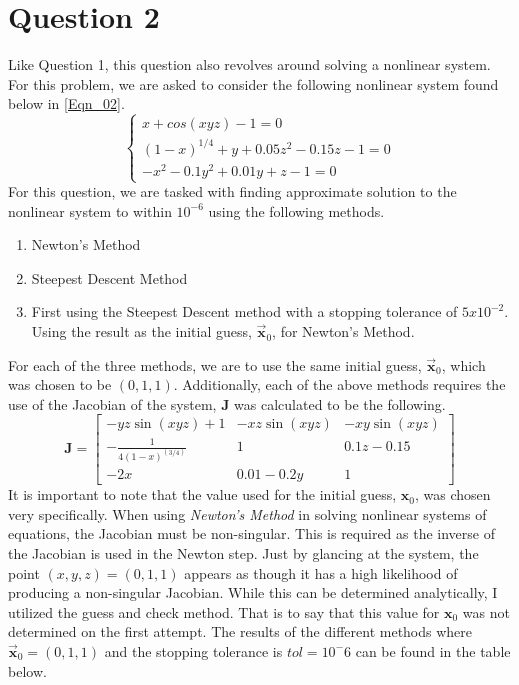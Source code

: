 \documentclass{article}
\begin{document}
\section{Question 2}
Like Question 1, this question also revolves around solving a nonlinear system. For this problem, we are asked to consider the following nonlinear system found below in \ref{Eqn_02}.
\begin{equation}
    \label{Eqn_02}
    \begin{cases}
        x+cos(xyz)-1=0 \\
        (1-x)^{1/4}+y+0.05z^2-0.15z-1 = 0 \\
        -x^2-0.1y^2+0.01y+z-1=0
    \end{cases}
\end{equation}
For this question, we are tasked with finding approximate solution to the nonlinear system to within \(10^{-6}\) using the following methods.
\begin{enumerate}
    \item Newton's Method
    \item Steepest Descent Method
    \item First using the Steepest Descent method with a stopping tolerance of \(5x10^{-2}\). Using the result as the initial guess, \(\mathbf{\Vec{x}}_0\), for Newton's Method.
\end{enumerate}
For each of the three methods, we are to use the same initial guess, \(\mathbf{\Vec{x}}_0\), which was chosen to be \((0,1,1)\). Additionally, each of the above methods requires the use of the Jacobian of the system, \(\mathbf{J}\) was calculated to be the following.
\[\mathbf{J} = 
\begin{bmatrix}
    -yz\sin{(xyz)}+1 & -xz\sin{(xyz)} & -xy\sin{(xyz)} \\
    -\frac{1}{4(1-x)^{(3/4)}} & 1 & 0.1z-0.15 \\
    -2x & 0.01-0.2y & 1
\end{bmatrix}
\]
It is important to note that the value used for the initial guess, \(\mathbf{x}_0\), was chosen very specifically. When using \textit{Newton's Method} in solving nonlinear systems of equations, the Jacobian must be non-singular. This is required as the inverse of the Jacobian is used in the Newton step. Just by glancing at the system, the point \((x,y,z) = (0,1,1)\) appears as though it has a high likelihood of producing a non-singular Jacobian. While this can be determined analytically, I utilized the guess and check method. That is to say that this value for \(\mathbf{x}_0\) was not determined on the first attempt. The results of the different methods where \(\mathbf{\Vec{x}}_0 = (0,1,1)\) and the stopping tolerance is \(tol = 10^-6\) can be found in the table below.
\end{document}
